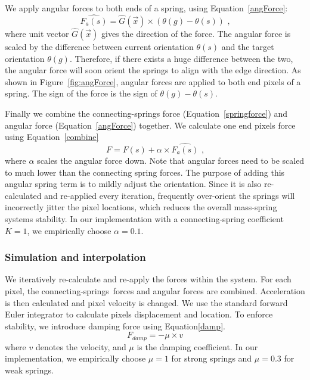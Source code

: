 We apply angular forces to both ends of a spring, using Equation~\eqref{angForce}:
 \begin{equation}\label{angForce}
\hat{F_a(s)} = \hat{G}(\vec{x})  \times (\theta(g) - \theta(s)) \text{ ,}
\end{equation}
where unit vector $\hat{G}(\vec{x})$ gives the direction of the force. The angular force is scaled by the difference between current orientation $\theta(s)$ and the target orientation $\theta(g)$. Therefore, if there exists a huge difference between the two, the angular force will soon orient the springs to align with the edge direction. As shown in Figure~\ref{fig:angForce}, angular forces are applied to both end pixels of a spring. The sign of the force is the sign of $\theta(g) - \theta(s)$.

Finally we combine the connecting-spring\textquotesingle s force (Equation~\ref{springforce}) and angular force (Equation~\ref{angForce}) together. We calculate one end pixel\textquotesingle s force using Equation~\eqref{combine}
\begin{equation}\label{combine}
F = F(s) + \alpha \times \hat{F_a(s)} \text{ ,}
\end{equation}
where $\alpha$ scales the angular force down. Note that angular forces need to be scaled to much lower than the connecting spring forces. The purpose of adding this angular spring term is to mildly adjust the orientation. Since it is also re-calculated and re-applied every iteration, frequently over-orient the springs will incorrectly jitter the pixel locations, which reduces the overall mass-spring system\textquotesingle s stability. In our implementation with a connecting-spring coefficient $K=1$, we empirically choose $\alpha = 0.1$.


\subsubsection{Simulation and interpolation}\label{subsec:damp}

We iteratively re-calculate and re-apply the forces within the system. For each pixel, the connecting-springs\textquotesingle ~forces and angular forces are combined. Acceleration is then calculated and pixel velocity is changed. We use the standard forward Euler integrator to calculate pixel\textquotesingle s displacement and location. To enforce stability, we introduce damping force using Equation\eqref{damp}. 
\begin{equation}\label{damp}
F_{damp} = -\mu \times v
\end{equation}
where $v$ denotes the velocity, and $\mu$ is the damping coefficient. In our implementation, we empirically choose $\mu = 1$ for strong springs and $\mu = 0.3$ for weak springs. 

